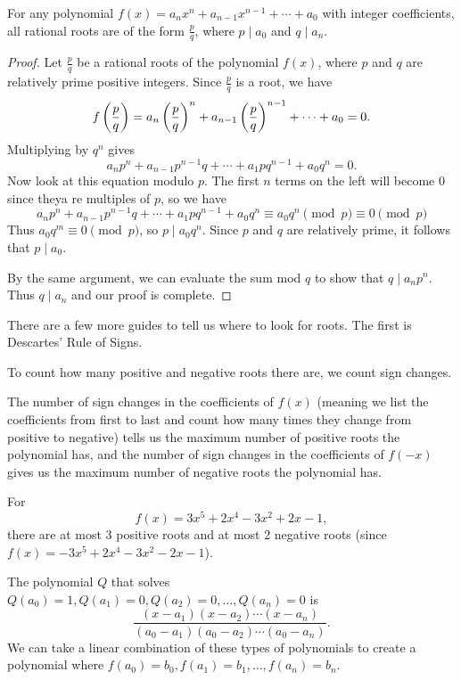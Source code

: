 \begin{theorem}
For any polynomial $f(x)=a_nx^n+a_{n-1}x^{n-1}+\cdots+a_0$ with integer coefficients, all rational roots are of the form $\frac{p}{q}$, where $p \mid a_0$ and $q \mid a_n$.
\end{theorem}

\begin{proof}
Let $\frac{p}{q}$ be a rational roots of the polynomial $f(x)$, where $p$ and $q$ are relatively prime positive integers. Since $\frac{p}{q}$ is a root, we have
\[f\left(\frac{p}{q}\right)=a_n\left(\frac{p}{q}\right)^n+a_{n-1}\left(\frac{p}{q}\right)^{n-1}+\cdots+a_0=0.\]
Multiplying by $q^n$ gives
\[a_np^n+a_{n-1}p^{n-1}q+\cdots+a_1pq^{n-1}+a_0q^n=0.\]
Now look at this equation modulo $p$. The first $n$ terms on the left will become $0$ since theya re multiples of $p$, so we have
\[a_np^n+a_{n-1}p^{n-1}q+\cdots+a_1pq^{n-1}+a_0q^n\equiv a_0q^n\pmod p\equiv0\pmod p\]
Thus $a_0q^m\equiv0\pmod p$, so $p\mid a_0q^n$. Since $p$ and $q$ are relatively prime, it follows that $p\mid a_0$.

By the same argument, we can evaluate the sum mod $q$ to show that $q\mid a_np^n$. Thus $q\mid a_n$ and our proof is complete.
\end{proof}

There are a few more guides to tell us where to look for roots. The first is Descartes' Rule of Signs.

\begin{theorem}
To count how many positive and negative roots there are, we count sign changes.

The number of sign changes in the coefficients of $f(x)$ (meaning we list the coefficients from first to last and count how many times they change from positive to negative) tells us the maximum number of positive roots the polynomial has, and the number of sign changes in the coefficients of $f(-x)$ gives us the maximum number of negative roots the polynomial has.
\end{theorem}

\begin{example}
For
\[f(x)=3x^5+2x^4-3x^2+2x-1,\]
there are at most 3 positive roots and at most 2 negative roots (since $f(x)=-3x^5+2x^4-3x^2-2x-1$).
\end{example}

\begin{theorem}
The polynomial $Q$ that solves $Q(a_0)=1, Q(a_1)=0, Q(a_2)=0, \dots, Q(a_n)=0$ is
\[ \frac{(x-a_1)(x-a_2)\cdots(x-a_n)}{(a_0-a_1)(a_0-a_2)\cdots(a_0-a_n)}. \]
We can take a linear combination of these types of polynomials to create a polynomial where $f(a_0)=b_0, f(a_1)=b_1, \dots, f(a_n)=b_n$.
\end{theorem}

